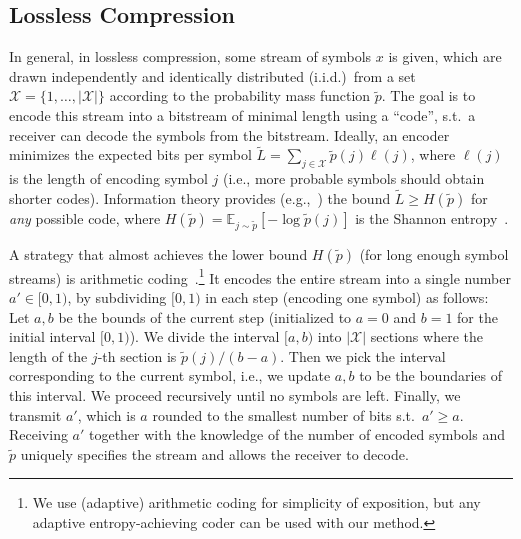 \documentclass[10pt,twocolumn,letterpaper]{article}
\makeatletter
\newcommand{\expectE}{\mathbb{E}}
\newcommand{\Preal}{\tilde{p}}
\newcommand{\X}{\mathcal{X}}
\renewcommand{\paragraph}{\@startsection{paragraph}{4}{\z@}{2ex \@plus 1.25ex \@minus .5ex}{-1em}{\normalfont\normalsize\bfseries}}
\makeatother
\begin{document}
\subsection{Lossless Compression} \label{sec:losslesscomp}

In general, in lossless compression, some stream of symbols $x$ is given, which are drawn independently and identically distributed (i.i.d.)\ from a set $\X = \{1, \dots, |\X|\}$ according to the probability mass function $\Preal$. The goal is to encode this stream into a bitstream of minimal length using a ``code'', s.t.\ a receiver can decode the symbols from the bitstream. Ideally, an encoder minimizes the expected bits per symbol $\tilde L = \sum_{j \in \X} \Preal(j) \ell(j)$, where $\ell(j)$ is the length of encoding symbol $j$ (i.e., more probable symbols should obtain shorter codes). Information theory provides (e.g.,~\cite{cover2012elements}) the bound $\tilde L \ge H(\Preal)$ for \emph{any} possible code, where $H(\Preal) = \expectE_{j \sim \Preal}[-\log \Preal(j)]$ is the Shannon entropy~\cite{shannon1948it}.
    
\paragraph{Arithmetic Coding} A strategy that almost achieves the lower bound $H(\Preal)$ (for long enough symbol streams) is arithmetic coding~\cite{witten1987arithmetic}.\footnote{We use (adaptive) arithmetic coding for simplicity of exposition, but any adaptive entropy-achieving coder can be used with our method.} It encodes the entire stream into a single number $a' \in [0, 1)$, by subdividing $[0, 1)$ in each step (encoding one symbol) as follows: Let $a, b$ be the bounds of the current step (initialized to $a=0$ and $b=1$ for the initial interval $[0,1)$). We divide the interval $[a, b)$ into $|\X|$ sections where the length of the $j$-th section is $\Preal(j) / (b-a)$. Then we pick the interval corresponding to the current symbol, i.e., we update $a, b$ to be the boundaries of this interval. We proceed recursively until no symbols are left. Finally, we transmit $a'$, which is $a$ rounded to the smallest number of bits s.t.\ $a' \ge a$. Receiving $a'$ together with the knowledge of the number of encoded symbols and $\Preal$ uniquely specifies the stream and allows the receiver to decode.
\end{document}
